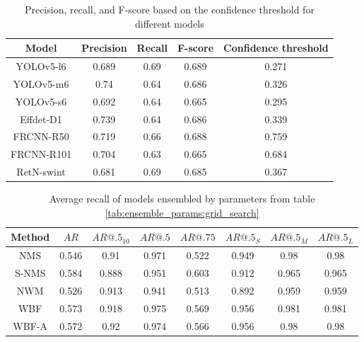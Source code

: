 \begin{table}[H]
    \begin{tabular}{|c|c|c|c|c|}
        \hline
        Model      & Precision & Recall & F-score & Confidence threshold \\ \hline
        YOLOv5-l6  & 0.689     & 0.69   & 0.689   & 0.271                \\ \hline
        YOLOv5-m6  & 0.74      & 0.64   & 0.686   & 0.326                \\ \hline
        YOLOv5-s6  & 0.692     & 0.64   & 0.665   & 0.295                \\ \hline
        Effdet-D1  & 0.739     & 0.64   & 0.686   & 0.339                \\ \hline
        FRCNN-R50  & 0.719     & 0.66   & 0.688   & 0.759                \\ \hline
        FRCNN-R101 & 0.704     & 0.63   & 0.665   & 0.684                \\ \hline
        RetN-swint & 0.681     & 0.69   & 0.685   & 0.367                \\ \hline
    \end{tabular}
    \caption{Precision, recall, and F-score based on the confidence threshold for different models}
    \label{tab:imrpoved:prf}
\end{table}

\begin{table}[h]
    \centering
    \begin{tabular}{|c|c|c|c|c|c|c|c|}
        \hline
        Method & $AR$  & $AR@.5_{10}$ & $AR@.5$ & $AR@.75$ & $AR@.5_S$ & $AR@.5_M$ & $AR@.5_L$ \\ \hline
        NMS    & 0.546 & 0.91         & 0.971   & 0.522    & 0.949     & 0.98      & 0.98      \\ \hline
        S-NMS  & 0.584 & 0.888        & 0.951   & 0.603    & 0.912     & 0.965     & 0.965     \\ \hline
        NWM    & 0.526 & 0.913        & 0.941   & 0.513    & 0.892     & 0.959     & 0.959     \\ \hline
        WBF    & 0.573 & 0.918        & 0.975   & 0.569    & 0.956     & 0.981     & 0.981     \\ \hline
        WBF-A  & 0.572 & 0.92         & 0.974   & 0.566    & 0.956     & 0.98      & 0.98      \\ \hline
    \end{tabular}
    \caption{Average recall of models ensembled by parameters from table \ref{tab:ensemble_params:grid_search}}
    \label{tab:recall:grid_search}
\end{table}


